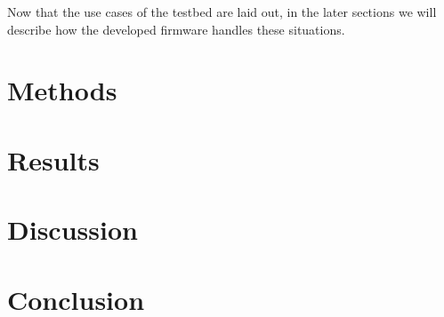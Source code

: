 \documentclass[
    twocolumn,
    fontsize = 10pt,
    parskip = half+,
    headings = small,
    headwidth = text,
    footwidth = text,
]{scrartcl}
\begin{document}
Now that the use cases of the testbed are laid out, in the later sections we will describe how the developed firmware handles these situations. 



\section{Methods}

\section{Results}


\section{Discussion}


\section{Conclusion}

\printbibliography

\printglossaries
\appendix
{}

\end{document}
